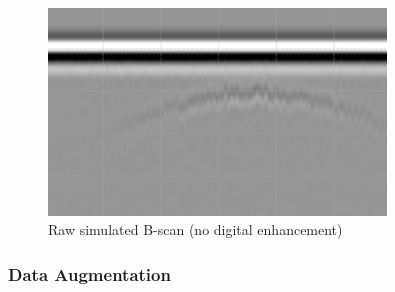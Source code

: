         \begin{figure}[htbp]
            \centering
            \includegraphics[width=0.8\textwidth]{figs/Rory/sim_bscan_cropped.png}
            \caption{Raw simulated B-scan (no digital enhancement)}
            \label{fig:original_bscan}
        \end{figure}
    
    \subsubsection{Data Augmentation}
    
